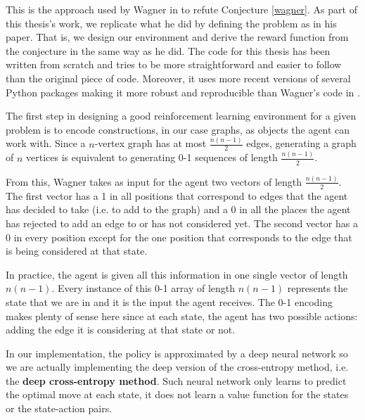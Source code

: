 \documentclass[11pt]{article}
\theoremstyle{definition}
\begin{document}

This is the approach used by Wagner in \cite{Wagner:2021} to refute Conjecture \ref{wagner}. As part of this thesis's work, we replicate what he did by defining the problem as in his paper. That is, we design our environment and derive the reward function from the conjecture in the same way as he did. The code for this thesis has been written from scratch and tries to be more straightforward and easier to follow than the original piece of code. Moreover, it uses more recent versions of several Python packages making it more robust and reproducible than Wagner's code in \cite{GithubWagner}.

The first step in designing a good reinforcement learning environment for a given problem is to encode constructions, in our case graphs, as objects the agent can work with. Since a $n$-vertex graph has at most $\frac{n(n-1)}{2}$ edges, generating a graph of $n$ vertices is equivalent to generating 0-1 sequences of length $\frac{n(n-1)}{2}$. 

From this, Wagner takes as input for the agent two vectors of length $\frac{n(n-1)}{2}$. The first vector has a 1 in all positions that correspond to edges that the agent has decided to take (i.e. to add to the graph) and a 0 in all the places the agent has rejected to add an edge to or has not considered yet. The second vector has a 0 in every position except for the one position that corresponds to the edge that is being considered at that state. 

In practice, the agent is given all this information in one single vector of length $n(n-1)$. Every instance of this 0-1 array of length $n(n-1)$ represents the state that we are in and it is the input the agent receives. The 0-1 encoding makes plenty of sense here since at each state, the agent has two possible actions: adding the edge it is considering at that state or not. 

In our implementation, the policy is approximated by a deep neural network so we are actually implementing the deep version of the cross-entropy method, i.e. the \textbf{deep cross-entropy method}. Such neural network only learns to predict the optimal move at each state, it does not learn a value function for the states or the state-action pairs.
\end{document}
